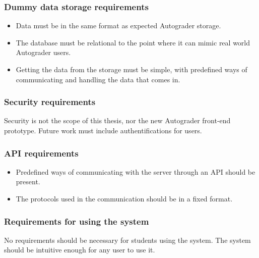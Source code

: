 \subsubsection{Dummy data storage requirements}
\begin{itemize}
\item Data must be in the same format as expected Autograder storage.
\item The database must be relational to the point where it can mimic real world Autograder users.
\item Getting the data from the storage must be simple, with predefined ways of communicating and handling the data that comes in.
\end{itemize}

\subsubsection{Security requirements}
Security is not the scope of this thesis, nor the new Autograder front-end prototype. Future work must include authentifications for users.

\subsubsection{API requirements}
\begin{itemize}
\item Predefined ways of communicating with the server through an API should be present.
\item The protocols used in the communication should be in a fixed format.
\end{itemize}
\subsubsection{Requirements for using the system}
No requirements should be necessary for students using the system. The system should be intuitive enough for any user to use it.

